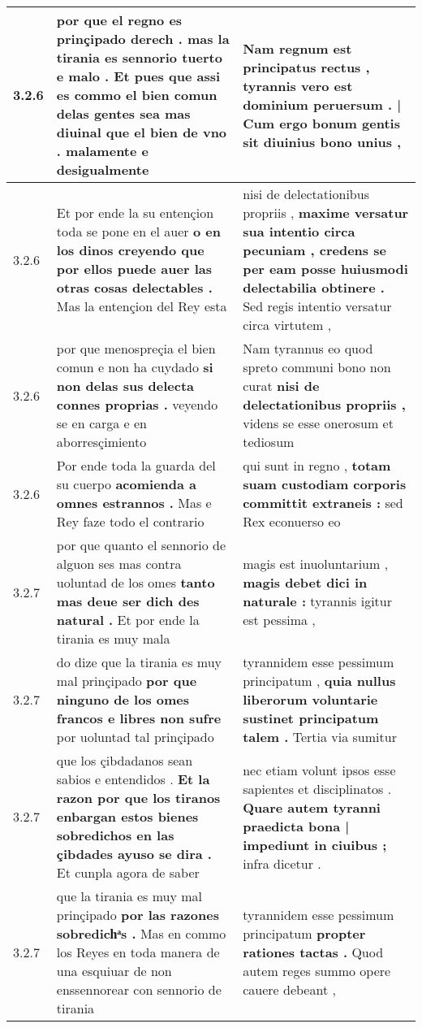 \begin{tabular}{|p{1cm}|p{6.5cm}|p{6.5cm}|}
3.2.6 & por que el regno es prinçipado derech . \textbf{ mas la tirania es sennorio tuerto e malo . Et pues que assi es commo el bien comun delas gentes sea mas diuinal que el bien de vno . } malamente e desigualmente & Nam regnum est principatus rectus , \textbf{ tyrannis vero est dominium peruersum . | Cum ergo bonum gentis sit } diuinius bono unius , \\\hline
3.2.6 & Et por ende la su entençion toda se pone en el auer \textbf{ o en los dinos creyendo que por ellos puede auer las otras cosas delectables . } Mas la entençion del Rey esta & nisi de delectationibus propriis , \textbf{ maxime versatur sua intentio circa pecuniam , credens se per eam posse huiusmodi delectabilia obtinere . } Sed regis intentio versatur circa virtutem , \\\hline
3.2.6 & por que menospreçia el bien comun e non ha cuydado \textbf{ si non delas sus delecta connes proprias . } veyendo se en carga e en aborresçimiento & Nam tyrannus eo quod spreto communi bono non curat \textbf{ nisi de delectationibus propriis , } videns se esse onerosum et tediosum \\\hline
3.2.6 & Por ende toda la guarda del su cuerpo \textbf{ acomienda a omnes estrannos . } Mas e Rey faze todo el contrario & qui sunt in regno , \textbf{ totam suam custodiam corporis committit extraneis : } sed Rex econuerso eo \\\hline
3.2.7 & por que quanto el sennorio de alguon ses mas contra uoluntad de los omes \textbf{ tanto mas deue ser dich des natural . } Et por ende la tirania es muy mala & magis est inuoluntarium , \textbf{ magis debet dici in naturale : } tyrannis igitur est pessima , \\\hline
3.2.7 & do dize que la tirania es muy mal prinçipado \textbf{ por que ninguno de los omes francos e libres non sufre } por uoluntad tal prinçipado & tyrannidem esse pessimum principatum , \textbf{ quia nullus liberorum voluntarie sustinet principatum talem . } Tertia via sumitur \\\hline
3.2.7 & que los çibdadanos sean sabios e entendidos . \textbf{ Et la razon por que los tiranos enbargan estos bienes sobredichos en las çibdades ayuso se dira . } Et cunpla agora de saber & nec etiam volunt ipsos esse sapientes et disciplinatos . \textbf{ Quare autem tyranni praedicta bona | impediunt in ciuibus ; } infra dicetur . \\\hline
3.2.7 & que la tirania es muy mal prinçipado \textbf{ por las razones sobredichͣs . } Mas en commo los Reyes en toda manera de una esquiuar de non enssennorear con sennorio de tirania & tyrannidem esse pessimum principatum \textbf{ propter rationes tactas . } Quod autem reges summo opere cauere debeant , \\\hline

\end{tabular}
